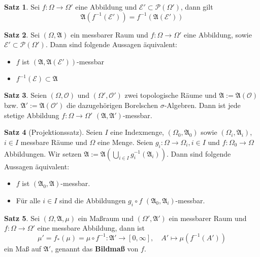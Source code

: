 \documentclass[a4paper,10pt,landscape]{article}
\newcommand{\Alg}{\mathfrak{A}}
\theoremstyle{definition}
\newtheorem*{satz}{Satz}
\theoremstyle{remark}
\renewcommand{\emph}[1]{\textcolor{Emph}{\bf{#1}}}
\begin{document}
\begin{multicols}{3}
\begin{satz}
  Sei $f : \Omega \to \Omega'$ eine Abbildung und $\mathcal{E}' \subset \mathcal{P}(\Omega')$, dann gilt
  \[ \Alg(f^{-1}(\mathcal{E}')) = f^{-1}(\Alg(\mathcal{E}')) \]
\end{satz}

\begin{satz}
  Sei $(\Omega, \Alg)$ ein messbarer Raum und $f : \Omega \to \Omega'$ eine Abbildung, sowie $\mathcal{E'} \subset \mathcal{P}(\Omega')$. Dann sind folgende Aussagen äquivalent:
  \begin{itemize}
    \item $f$ ist $(\Alg, \Alg(\mathcal{E}'))$-messbar
    \item $f^{-1}(\mathcal{E}) \subset \Alg$
  \end{itemize}
\end{satz}

\begin{satz}
  Seien $(\Omega, \mathcal{O})$ und $(\Omega', \mathcal{O}')$ zwei topologische Räume und $\Alg := \Alg(\mathcal{O})$ bzw. $\Alg' := \Alg(\mathcal{O}')$ die dazugehörigen Borelschen $\sigma$-Algebren. Dann ist jede stetige Abbildung $f : \Omega \to \Omega'$ $(\Alg, \Alg')$-messbar.
\end{satz}


\begin{satz}[Projektionssatz]
  Seien $I$ eine Indexmenge, $(\Omega_0, \Alg_0)$ sowie $(\Omega_i, \Alg_i)$, $i \in I$ messbare Räume und $\Omega$ eine Menge. Seien $g_i : \Omega \to \Omega_i, i \in I$ und $f : \Omega_0 \to \Omega$ Abbildungen. Wir setzen $\Alg := \Alg\left( \bigcup_{i \in I} g_i^{-1}(\Alg_i) \right)$. Dann sind folgende Aussagen äquivalent:
  \begin{itemize}
    \item $f$ ist $(\Alg_0, \Alg)$-messbar.
    \item Für alle $i \in I$ sind die Abbildungen $g_i \circ f$ $(\Alg_0, \Alg_i)$-messbar.
  \end{itemize}
\end{satz}

\begin{satz}
  Sei $(\Omega, \Alg, \mu)$ ein Maßraum und $(\Omega', \Alg')$ ein messbarer Raum und $f : \Omega \to \Omega'$ eine messbare Abbildung, dann ist
  \[ \mu' = f_*(\mu) = \mu \circ f^{-1} : \Alg' \to [0, \infty], \quad A' \mapsto \mu(f^{-1}(A')) \]
  ein Maß auf $\Alg'$, genannt das \emph{Bildmaß} von $f$.
\end{satz}


\end{multicols}
\end{document}

